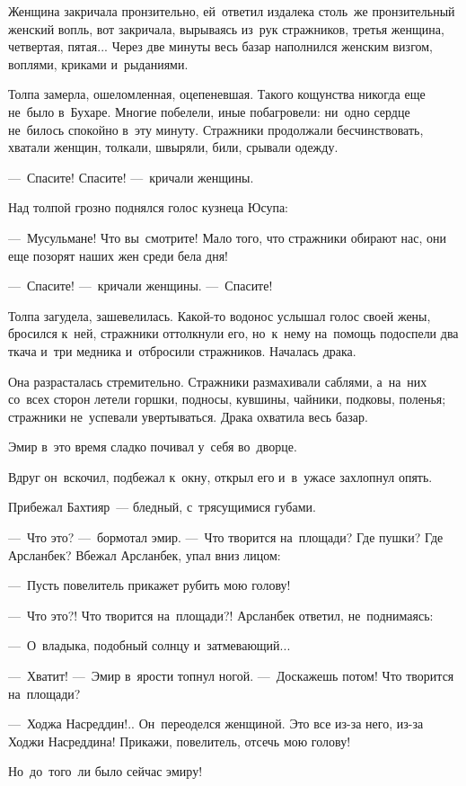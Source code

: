 \documentclass[12pt,a4paper]{book}
\begin{document}
Женщина закричала пронзительно, ей~ответил издалека столь~же пронзительный женский вопль, вот закричала, вырываясь из~рук стражников, третья женщина, четвертая, пятая... Через две минуты весь базар наполнился женским визгом, воплями, криками и~рыданиями.

Толпа замерла, ошеломленная, оцепеневшая. Такого кощунства никогда еще не~было в~Бухаре. Многие побелели, иные побагровели: ни~одно сердце не~билось спокойно в~эту минуту. Стражники продолжали бесчинствовать, хватали женщин, толкали, швыряли, били, срывали одежду.

—~Спасите! Спасите! —~кричали женщины.

Над толпой грозно поднялся голос кузнеца Юсупа:

—~Мусульмане! Что вы~смотрите! Мало того, что стражники обирают нас, они еще позорят наших жен среди бела дня!

—~Спасите! —~кричали женщины. —~Спасите!

Толпа загудела, зашевелилась. Какой-то водонос услышал голос своей жены, бросился к~ней, стражники оттолкнули его, но~к~нему на~помощь подоспели два ткача и~три медника и~отбросили стражников. Началась драка.

Она разрасталась стремительно. Стражники размахивали саблями, а~на~них со~всех сторон летели горшки, подносы, кувшины, чайники, подковы, поленья; стражники не~успевали увертываться. Драка охватила весь базар.

Эмир в~это время сладко почивал у~себя во~дворце.

Вдруг он~вскочил, подбежал к~окну, открыл его и~в~ужасе захлопнул опять.

Прибежал Бахтияр~— бледный, с~трясущимися губами.

—~Что это? —~бормотал эмир. —~Что творится на~площади? Где пушки? Где Арсланбек? Вбежал Арсланбек, упал вниз лицом:

—~Пусть повелитель прикажет рубить мою голову!

—~Что это?! Что творится на~площади?! Арсланбек ответил, не~поднимаясь:

—~О~владыка, подобный солнцу и~затмевающий...

—~Хватит! —~Эмир в~ярости топнул ногой. —~Доскажешь потом! Что творится на~площади?

—~Ходжа Насреддин!.. Он~переоделся женщиной. Это все из-за него, из-за Ходжи Насреддина! Прикажи, повелитель, отсечь мою голову!

Но~до~того~ли было сейчас эмиру!
\end{document}
